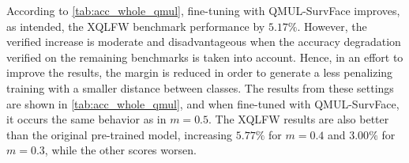 \documentclass[class=report, crop=false, a4paper, 12pt]{standalone}
\begin{document}
\par According to \autoref{tab:acc_whole_qmul}, fine-tuning with QMUL-SurvFace improves, as intended, the XQLFW benchmark performance by $5.17\%$. However, the verified increase is moderate and disadvantageous when the accuracy degradation verified on the remaining benchmarks is taken into account. Hence, in an effort to improve the results, the margin is reduced in order to generate a less penalizing training with a smaller distance between classes. The results from these settings are shown in \autoref{tab:acc_whole_qmul}, and when fine-tuned with QMUL-SurvFace, it occurs the same behavior as in $m=0.5$. The XQLFW results are also better than the original pre-trained model, increasing $5.77\%$ for $m=0.4$ and $3.00\%$ for $m=0.3$, while the other scores worsen. 
\begin{table}[H]
    \centering
    \caption{MobileFaceNet accuracy scores before and after fine-tuning the whole network on DigiFace-1M with different ArcFace margins.}
    \label{tab:acc_whole_digiface}
\end{table}
\end{document}
